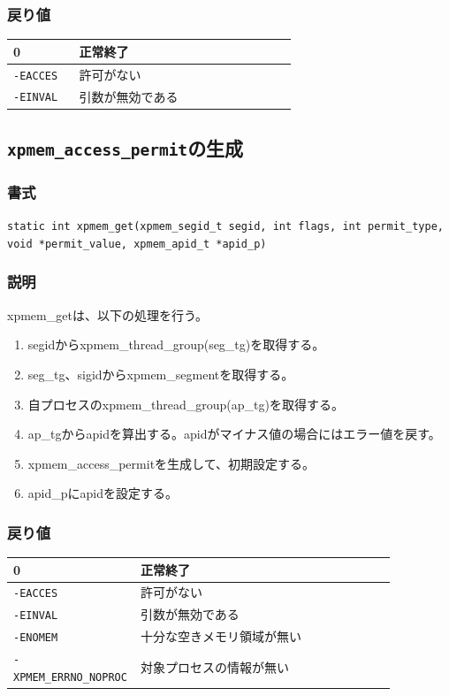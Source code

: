 \documentclass[twoside,11pt,fleqn]{book}
\begin{document}
\subsubsection*{戻り値}{\quad}
\begin{table}[!h]
\footnotesize
\begin{tabular}{|p{0.20\linewidth}|p{0.66\linewidth}|} \hline
0&正常終了\\ \hline
\texttt{-EACCES}&許可がない\\ \hline
\texttt{-EINVAL}&引数が無効である\\ \hline
\end{tabular}
\vspace{-0em}
\end{table}
\FloatBarrier

\subsection{\texttt{xpmem\_access\_permit}の生成}
\subsubsection*{書式}{\quad}
\texttt{static int xpmem\_get(xpmem\_segid\_t segid,
        int flags,
        int permit\_type,
        void *permit\_value,
        xpmem\_apid\_t *apid\_p)
}

\subsubsection*{説明}{\quad}
xpmem\_getは、以下の処理を行う。
\begin{enumerate}
  \item segidからxpmem\_thread\_group(seg\_tg)を取得する。
  \item seg\_tg、sigidからxpmem\_segmentを取得する。
  \item 自プロセスのxpmem\_thread\_group(ap\_tg)を取得する。
  \item ap\_tgからapidを算出する。apidがマイナス値の場合にはエラー値を戻す。
  \item xpmem\_access\_permitを生成して、初期設定する。
  \item apid\_pにapidを設定する。
\end{enumerate}

\subsubsection*{戻り値}{\quad}
\begin{table}[!h]
\footnotesize
\begin{tabular}{|p{0.20\linewidth}|p{0.66\linewidth}|} \hline
0&正常終了\\ \hline
\texttt{-EACCES}&許可がない\\ \hline
\texttt{-EINVAL}&引数が無効である\\ \hline
\texttt{-ENOMEM}&十分な空きメモリ領域が無い\\ \hline
\texttt{-XPMEM\_ERRNO\_NOPROC}&対象プロセスの情報が無い\\ \hline
\end{tabular}
\vspace{-0em}
\end{table}
\FloatBarrier
\end{document}
